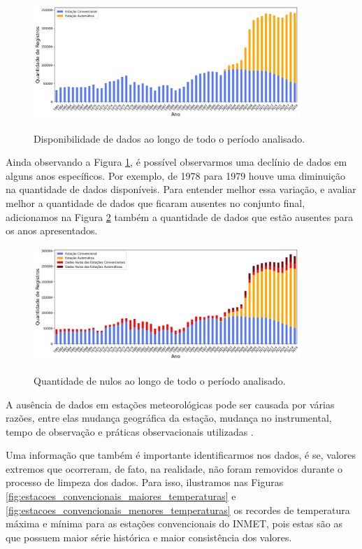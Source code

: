 \begin{figure}[H]
    \centering
    \caption{Disponibilidade de dados ao longo de todo o período analisado.}
    \includegraphics[width=0.9\textwidth]{figuras/disponibilizade_historica_de_dados.png}
    \label{fig:disponibilidade_historica_de_dados}
\end{figure}

Ainda observando a Figura \ref{fig:disponibilidade_historica_de_dados}, é possível observarmos uma declínio de dados em alguns anos específicos. Por exemplo, de 1978 para 1979 houve uma diminuição na quantidade de dados disponíveis. Para entender melhor essa variação, e avaliar melhor a quantidade de dados que ficaram ausentes no conjunto final, adicionamos na Figura \ref{fig:dados_ausentes_ao_longo_anos} também a quantidade de dados que estão ausentes para os anos apresentados.

\begin{figure}[H]
    \centering
    \caption{Quantidade de nulos ao longo de todo o período analisado.}
    \includegraphics[width=0.9\textwidth]{figuras/dados_ausentes_ao_longo_anos.png}
    \label{fig:dados_ausentes_ao_longo_anos}
\end{figure}

A ausência de dados em estações meteorológicas pode ser causada por várias razões, entre elas mudança geográfica da estação, mudança no instrumental, tempo de observação e práticas observacionais utilizadas \cite{oliveira2019estaccao}. 

Uma informação que também é importante identificarmos nos dados, é se, valores extremos que ocorreram, de fato, na realidade, não foram removidos durante o processo de limpeza dos dados.
Para isso, ilustramos nas Figuras \ref{fig:estacoes_convencionais_maiores_temperaturas} e \ref{fig:estacoes_convencionais_menores_temperaturas} os recordes de temperatura máxima e mínima para as estações convencionais do INMET, pois estas são as que possuem maior série histórica e maior consistência dos valores. 

